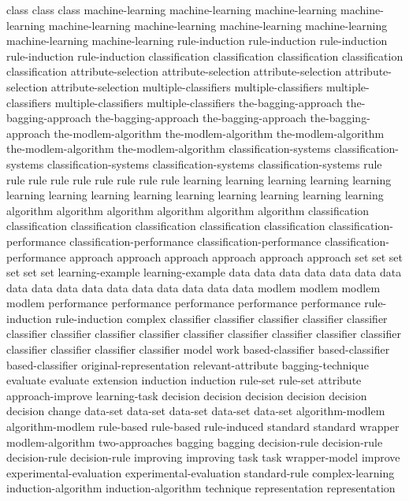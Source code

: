 class	class	class	
machine-learning	machine-learning	machine-learning	machine-learning	machine-learning	machine-learning	machine-learning	machine-learning	machine-learning	machine-learning	
rule-induction	rule-induction	rule-induction	rule-induction	rule-induction	
classification	classification	classification	classification	classification	
attribute-selection	attribute-selection	attribute-selection	attribute-selection	attribute-selection	
multiple-classifiers	multiple-classifiers	multiple-classifiers	multiple-classifiers	multiple-classifiers	
the-bagging-approach	the-bagging-approach	the-bagging-approach	the-bagging-approach	the-bagging-approach	
the-modlem-algorithm	the-modlem-algorithm	the-modlem-algorithm	the-modlem-algorithm	the-modlem-algorithm	
classification-systems	classification-systems	classification-systems	classification-systems	classification-systems	
rule	rule	rule	rule	rule	rule	rule	rule	rule	
learning	learning	learning	learning	learning	learning	learning	learning	learning	learning	learning	learning	learning	learning	
algorithm	algorithm	algorithm	algorithm	algorithm	algorithm	
classification	classification	classification	classification	classification	classification	
classification-performance	classification-performance	classification-performance	classification-performance	
approach	approach	approach	approach	approach	approach	
set	set	set	set	set	set	
learning-example	learning-example	
data	data	data	data	data	data	data	data	data	data	data	data	data	data	data	data	data	
modlem	modlem	modlem	modlem	
performance	performance	performance	performance	performance	
rule-induction	rule-induction	
complex	
classifier	classifier	classifier	classifier	classifier	classifier	classifier	classifier	classifier	classifier	classifier	classifier	classifier	classifier	classifier	classifier	classifier	classifier	
model	
work	
based-classifier	based-classifier	based-classifier	
original-representation	
relevant-attribute	
bagging-technique	
evaluate	evaluate	
extension	
induction	induction	
rule-set	rule-set	
attribute	
approach-improve	
learning-task	
decision	decision	decision	decision	decision	decision	
change	
data-set	data-set	data-set	data-set	data-set	
algorithm-modlem	algorithm-modlem	
rule-based	rule-based	
rule-induced	
standard	standard	
wrapper	
modlem-algorithm	
two-approaches	
bagging	bagging	
decision-rule	decision-rule	decision-rule	decision-rule	
improving	improving	
task	task	
wrapper-model	
improve	
experimental-evaluation	experimental-evaluation	
standard-rule	
complex-learning	
induction-algorithm	induction-algorithm	
technique	
representation	representation	
